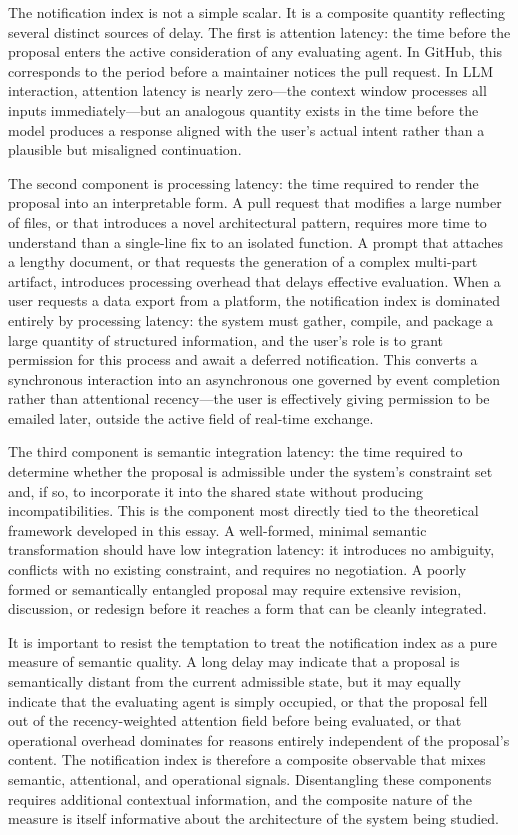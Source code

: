 \documentclass[12pt, letterpaper]{article}
\begin{document}
The notification index is not a simple scalar. It is a composite quantity reflecting several distinct sources of delay. The first is attention latency: the time before the proposal enters the active consideration of any evaluating agent. In GitHub, this corresponds to the period before a maintainer notices the pull request. In LLM interaction, attention latency is nearly zero---the context window processes all inputs immediately---but an analogous quantity exists in the time before the model produces a response aligned with the user's actual intent rather than a plausible but misaligned continuation.

The second component is processing latency: the time required to render the proposal into an interpretable form. A pull request that modifies a large number of files, or that introduces a novel architectural pattern, requires more time to understand than a single-line fix to an isolated function. A prompt that attaches a lengthy document, or that requests the generation of a complex multi-part artifact, introduces processing overhead that delays effective evaluation. When a user requests a data export from a platform, the notification index is dominated entirely by processing latency: the system must gather, compile, and package a large quantity of structured information, and the user's role is to grant permission for this process and await a deferred notification. This converts a synchronous interaction into an asynchronous one governed by event completion rather than attentional recency---the user is effectively giving permission to be emailed later, outside the active field of real-time exchange.

The third component is semantic integration latency: the time required to determine whether the proposal is admissible under the system's constraint set and, if so, to incorporate it into the shared state without producing incompatibilities. This is the component most directly tied to the theoretical framework developed in this essay. A well-formed, minimal semantic transformation should have low integration latency: it introduces no ambiguity, conflicts with no existing constraint, and requires no negotiation. A poorly formed or semantically entangled proposal may require extensive revision, discussion, or redesign before it reaches a form that can be cleanly integrated.

It is important to resist the temptation to treat the notification index as a pure measure of semantic quality. A long delay may indicate that a proposal is semantically distant from the current admissible state, but it may equally indicate that the evaluating agent is simply occupied, or that the proposal fell out of the recency-weighted attention field before being evaluated, or that operational overhead dominates for reasons entirely independent of the proposal's content. The notification index is therefore a composite observable that mixes semantic, attentional, and operational signals. Disentangling these components requires additional contextual information, and the composite nature of the measure is itself informative about the architecture of the system being studied.
\end{document}
